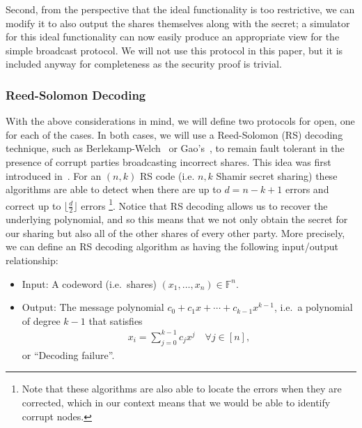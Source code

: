 \documentclass{article}
\newcommand\paper{paper}
\newcommand{\seq}[1]{\left[#1\right]}
\theoremstyle{remark}
\newcommand{\F}{\mathbb{F}}
\begin{document}
Second, from the perspective that the ideal functionality is too restrictive,
we can modify it to also output the shares themselves along with the secret; a
simulator for this ideal functionality can now easily produce an appropriate
view for the simple broadcast protocol. We will not use this protocol in this
\paper{}, but it is included anyway for completeness as the security proof is
trivial.

\subsubsection{Reed-Solomon Decoding}

With the above considerations in mind, we will define two protocols for open,
one for each of the cases. In both cases, we will use a Reed-Solomon (RS)
decoding technique, such as Berlekamp-Welch~\cite{welch_1986} or
Gao's~\cite{gao_2003}, to remain fault tolerant in the presence of corrupt
parties broadcasting incorrect shares. This idea was first introduced
in~\cite{ms81}. For an $(n, k)$ RS code (i.e. $n, k$ Shamir secret sharing)
these algorithms are able to detect when there are up to $d = n - k + 1$ errors
and correct up to $\lfloor \frac{d}{2} \rfloor$ errors%
\footnote{%
	Note that these algorithms are also able to locate the errors when they are
	corrected, which in our context means that we would be able to identify
	corrupt nodes.
}.
Notice that RS decoding allows us to recover the underlying polynomial, and so
this means that we not only obtain the secret for our sharing but also all of
the other shares of every other party. More precisely, we can define an RS
decoding algorithm as having the following input/output relationship:

\begin{itemize}
	\item Input: A codeword (i.e.\ shares) $(x_1, \ldots, x_n) \in \F^n$.
	\item Output: The message polynomial $c_0 + c_1 x + \cdots + c_{k-1}
		x^{k-1}$, i.e.\ a polynomial of degree $k-1$ that satisfies
		\begin{align*}
			x_i = \sum_{j=0}^{k-1} c_j x^j \quad \forall j \in \seq{n},
		\end{align*}
		or ``Decoding failure''.
\end{itemize}
\end{document}
